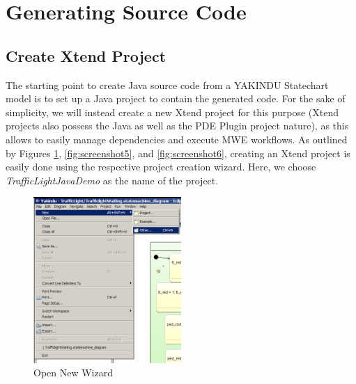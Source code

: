 %
\section{Generating Source Code}

\subsection{Create Xtend Project}
The starting point to create Java source code from a YAKINDU Statechart model
is to set up a Java project to contain the generated code. For the sake of
simplicity, we will instead create a new Xtend project for this purpose (Xtend
projects also possess the Java as well as the PDE Plugin project nature), as
this allows to easily manage dependencies and execute MWE workflows. As
outlined by Figures \ref{fig:screenshot4}, \ref{fig:screenshot5}, and
\ref{fig:screenshot6}, creating an Xtend project is easily done using the
respective project creation wizard. Here, we choose \emph{TrafficLightJavaDemo}
as the name of the project.

\begin{figure}[h!]
\center
\includegraphics[width=0.5\textwidth]{./Pictures/Screenshot4}
\caption{\label{fig:screenshot4} Open New Wizard}
\end{figure}

